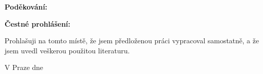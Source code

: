 {  %
  \thispagestyle{plain}
  \noindent
  \begin{minipage}[t]{\textwidth}\vspace{0pt}%
    \doccol \Large \textbf{Poděkování:}
  \end{minipage} \par
  \vspace{0.5cm}
  \noindent
  \begin{minipage}[t]{\textwidth}\vspace{0pt}%
    \@Acknowledgment
  \end{minipage} \par
  \vfill
  \noindent
  \begin{minipage}[t]{\textwidth}\vspace{0pt}%
    \doccol \Large \textbf{Čestné prohlášení:}
  \end{minipage} \par
  \vspace{0.5cm}
  \noindent
  \begin{minipage}[t]{\textwidth}\vspace{0pt}%
    Prohlašuji na tomto místě, že jsem předloženou práci vypracoval samostatně, a že jsem uvedl veškerou použitou literaturu.
  \end{minipage} \par
  \vspace{1.5cm}
  \noindent
  \begin{minipage}[t]{0.7\textwidth}\vspace{0pt}%
    V Praze dne \@date
  \end{minipage}
  \begin{minipage}[t]{0.3\textwidth}\vspace{0pt}%
    \centering ~ \par \textbf{\dotfill} \par \@author
  \end{minipage}
  \clearpage

  \thispagestyle{plain}
}
